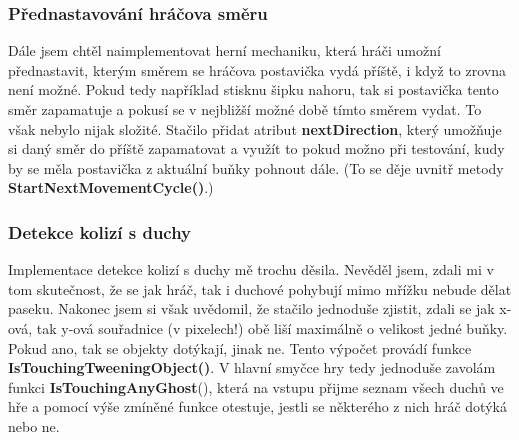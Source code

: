 \documentclass[a4]{article}
\begin{document}
\subsubsection{Přednastavování hráčova směru}
Dále jsem chtěl naimplementovat herní mechaniku, která hráči umožní přednastavit, kterým směrem se hráčova postavička vydá příště, i když to zrovna není možné. Pokud tedy například stisknu šipku nahoru, tak si postavička tento směr zapamatuje a pokusí se v nejbližší možné době tímto směrem vydat. To však nebylo nijak složité. Stačilo přidat atribut \textbf{nextDirection}, který umožňuje si daný směr do příště zapamatovat a využít to pokud možno při testování, kudy by se měla postavička z aktuální buňky pohnout dále. (To se děje uvnitř metody \textbf{StartNextMovementCycle()}.)
\subsubsection{Detekce kolizí s duchy}
Implementace detekce kolizí s duchy mě trochu děsila. Nevěděl jsem, zdali mi v tom skutečnost, že se jak hráč, tak i duchové pohybují mimo mřížku nebude dělat paseku. Nakonec jsem si však uvědomil, že stačilo jednoduše zjistit, zdali se jak x-ová, tak y-ová souřadnice (v pixelech!) obě liší maximálně o velikost jedné buňky. Pokud ano, tak se objekty dotýkají, jinak ne. Tento výpočet provádí funkce \textbf{IsTouchingTweeningObject()}. V hlavní smyčce hry tedy jednoduše zavolám funkci \textbf{IsTouchingAnyGhost}(), která na vstupu přijme seznam všech duchů ve hře a pomocí výše zmíněné funkce otestuje, jestli se některého z nich hráč dotýká nebo ne.
\end{document}

